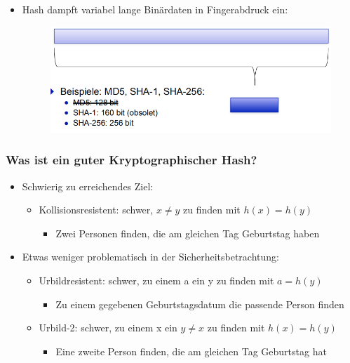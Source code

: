 \documentclass[openany]{book}
\begin{document}
\begin{itemize}
    \item Hash dampft variabel lange Binärdaten in Fingerabdruck ein:
    \begin{figure}[h!]
        \centering
        \includegraphics[width=\linewidth]{Pics/Hashing1.PNG}
    \end{figure} 
\end{itemize}

\subsubsection{Was ist ein guter Kryptographischer Hash?}

\begin{itemize}
    \item Schwierig zu erreichendes Ziel:
    \begin{itemize}
        \item Kollisionsresistent: schwer, $x\neq y$ zu finden mit $h(x)=h(y)$
        \begin{itemize}
            \item Zwei Personen finden, die am gleichen Tag Geburtstag haben
        \end{itemize}
    \end{itemize}
    \item Etwas weniger problematisch in der Sicherheitsbetrachtung:
    \begin{itemize}
        \item Urbildresistent: schwer, zu einem a ein y zu finden mit $a=h(y)$
        \begin{itemize}
            \item Zu einem gegebenen Geburtstagsdatum die passende Person finden
        \end{itemize}
        \item Urbild-2: schwer, zu einem x ein $y\neq x$ zu finden mit $h(x)=h(y)$
        \begin{itemize}
            \item Eine zweite Person finden, die am gleichen Tag Geburtstag hat
        \end{itemize}
    \end{itemize}
\end{itemize}
\end{document}
